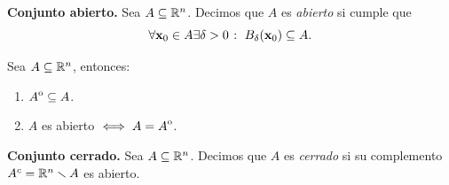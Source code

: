   \begin{definition} \textbf{Conjunto abierto.} \label{def:abierto}
       Sea $A  \subseteq  \mathbb{R}^n$. Decimos que $A$ es \emph{abierto} si cumple que
   \[
        \forall \vect{x}_0 \in A \exists \delta > 0 \; \colon \; B_{\delta}(\vect{x}_0)  \subseteq  A.  
   \]
   \end{definition}
   
   \begin{propertie}  \label{prop:abierto_int}    Sea  $A \subseteq \mathbb{R}^n$, entonces:
   \begin{enumerate}
    \item \( {\kern0ptA}^{\mathrm{o}} \subseteq A \).
    \item \(A\) es abierto \(\iff A={\kern0ptA}^{\mathrm{o}}\).
    \end{enumerate}
    \end{propertie}
   
   \begin{definition} \textbf{Conjunto cerrado.} \label{def:cerrado}
    Sea $A  \subseteq  \mathbb{R}^n$. Decimos que $A$ es \emph{cerrado} si su complemento $A^c = \mathbb{R}^n \smallsetminus A$ es abierto.
   \end{definition}
   